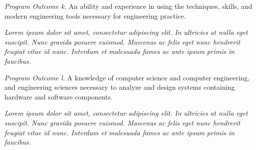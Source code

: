 \documentclass[letterpaper]{../kuthesis/kuthesis}
\begin{document}
\textit{Program Outcome k.}  An ability and experience in using the techniques, skills, and modern engineering tools necessary for engineering practice.
\begin{adjustwidth}{0.5in}{0in}
\textit{Lorem ipsum dolor sit amet, consectetur adipiscing elit. In ultricies at nulla eget suscipit. Nunc gravida posuere euismod. Maecenas ac felis eget nunc hendrerit feugiat vitae id nunc. Interdum et malesuada fames ac ante ipsum primis in faucibus. }\\
\end{adjustwidth}
\textit{Program Outcome l.}  A knowledge of computer science and computer engineering, and engineering sciences necessary to analyze and design systems containing hardware and software components.
\begin{adjustwidth}{0.5in}{0in}
\textit{Lorem ipsum dolor sit amet, consectetur adipiscing elit. In ultricies at nulla eget suscipit. Nunc gravida posuere euismod. Maecenas ac felis eget nunc hendrerit feugiat vitae id nunc. Interdum et malesuada fames ac ante ipsum primis in faucibus. }\\
\end{adjustwidth}
\end{document}
